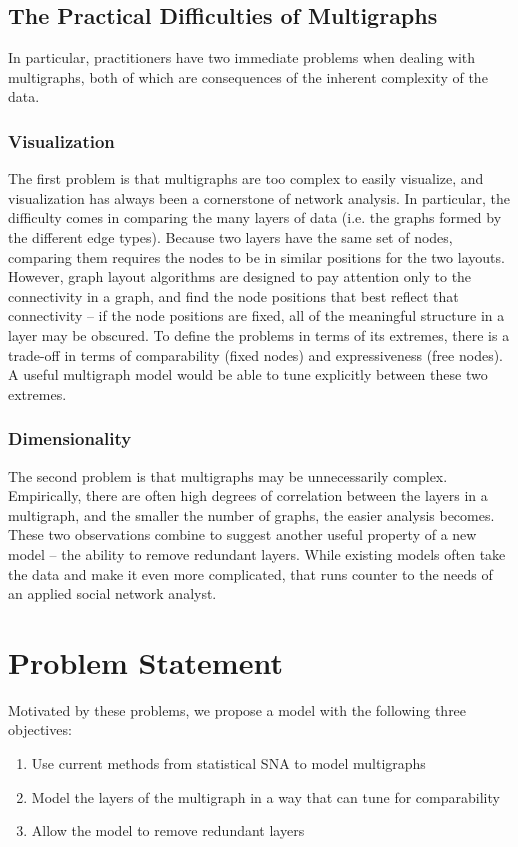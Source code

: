 \documentclass{article}
\begin{document}
\subsection{The Practical Difficulties of Multigraphs}
In particular, practitioners have two immediate problems when dealing with multigraphs, both of which are consequences of the inherent complexity of the data. 
\subsubsection{Visualization}
The first problem is that multigraphs are too complex to easily visualize, and visualization has always been a cornerstone of network analysis. In particular, the difficulty comes in comparing the many layers of data (i.e. the graphs formed by the different edge types). Because two layers have the same set of nodes, comparing them requires the nodes to be in similar positions for the two layouts. However, graph layout algorithms are designed to pay attention only to the connectivity in a graph, and find the node positions that best reflect that connectivity -- if the node positions are fixed, all of the meaningful structure in a layer may be obscured. To define the problems in terms of its extremes, there is a trade-off in terms of comparability (fixed nodes) and expressiveness (free nodes). A useful multigraph model would be able to tune explicitly between these two extremes.

\subsubsection{Dimensionality}
The second problem is that multigraphs may be unnecessarily complex. Empirically, there are often high degrees of correlation between the layers in a multigraph, and the smaller the number of graphs, the easier analysis becomes. These two observations combine to suggest another useful property of a new model -- the ability to remove redundant layers. While existing models often take the data and make it even more complicated, that runs counter to the needs of an applied social network analyst.

\section{Problem Statement}
Motivated by these problems, we propose a model with the following three objectives:

\begin{enumerate}
\item Use current methods from statistical SNA to model multigraphs
\item Model the layers of the multigraph in a way that can tune for comparability
\item Allow the model to remove redundant layers
\end{enumerate}
\end{document}
